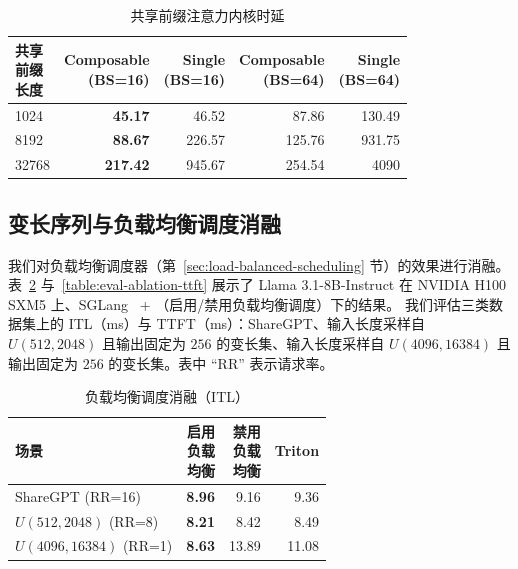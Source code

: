 \begin{table}[hbt]
\small
\centering
\caption{共享前缀注意力内核时延}
\label{table:eval-shared-prefix-attn}
\begin{tabular}{lr@{}r@{}r@{}r@{}}
\toprule
\makecell{共享\\前缀\\长度} & \makecell{Composable\\(BS=16)} & \makecell{Single\\(BS=16)} & \makecell{Composable\\(BS=64)} & \makecell{Single\\(BS=64)} \\
\midrule
1024   & \textbf{45.17}  & 46.52  & 87.86   & 130.49 \\
8192   & \textbf{88.67}  & 226.57 & 125.76  & 931.75 \\
32768  & \textbf{217.42} & 945.67 & 254.54  & 4090   \\
\bottomrule
\end{tabular}
\end{table}

\subsection{变长序列与负载均衡调度消融}

我们对负载均衡调度器（第~\ref{sec:load-balanced-scheduling} 节）的效果进行消融。
表~\ref{table:eval-ablation-itl} 与~\ref{table:eval-ablation-ttft} 展示了 Llama 3.1-8B-Instruct 在 NVIDIA H100 SXM5 上、SGLang~\cite{zheng2023sglang} + \sys（启用/禁用负载均衡调度）下的结果。
我们评估三类数据集上的 ITL（ms）与 TTFT（ms）：ShareGPT、输入长度采样自 $U(512,2048)$ 且输出固定为 $256$ 的变长集、输入长度采样自 $U(4096,16384)$ 且输出固定为 $256$ 的变长集。表中 “RR” 表示请求率。

\begin{table}[hbt]
\small
\centering
\vspace{-5pt}
\caption{负载均衡调度消融（ITL）}
\label{table:eval-ablation-itl}
\begin{tabular}{@{}lrrr@{}}
\toprule
场景 & \makecell{启用\\负载\\均衡} & \makecell{禁用\\负载\\均衡} & Triton \\
\midrule
ShareGPT (RR=16) & \textbf{8.96} & 9.16 & 9.36 \\
$U(512, 2048)$ (RR=8)        & \textbf{8.21} & 8.42 & 8.49 \\
$U(4096, 16384)$ (RR=1)        & \textbf{8.63} & 13.89 & 11.08 \\
\bottomrule
\end{tabular}
\end{table}

